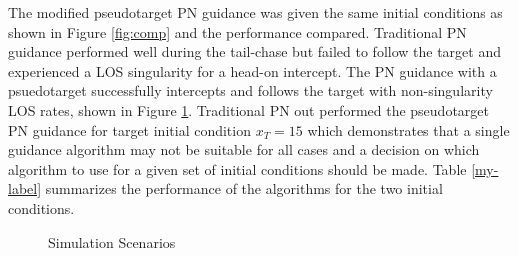 \documentclass[conference]{IEEEtran}
\begin{document}
The modified pseudotarget PN guidance was given the same initial conditions as shown in Figure \ref{fig:comp} and the performance compared. Traditional PN guidance performed well during the tail-chase but failed to follow the target and experienced a LOS singularity for a head-on intercept. The PN guidance with a psuedotarget successfully intercepts and follows the target with non-singularity LOS rates, shown in Figure \ref{fig:compwithpt}. Traditional PN out performed the pseudotarget PN guidance for target initial condition $x_{T} = 15$ which demonstrates that a single guidance algorithm may not be suitable for all cases and a decision on which algorithm to use for a given set of initial conditions should be made. Table \ref{my-label} summarizes the performance of the algorithms for the two initial conditions.

\begin{figure}[H]
	\begin{subfigmatrix}{2}%
		\centering
		\hspace*{0mm}
	\end{subfigmatrix}
	\caption{Simulation Scenarios}
	\label{fig:compwithpt}
\end{figure}
\end{document}
